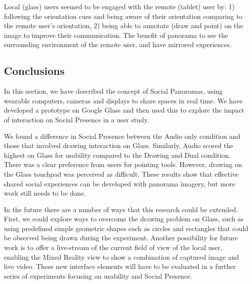 Local (glass) users seemed to be engaged with the remote (tablet) user by: 1) following the orientation cues and being aware of their orientation comparing to the remote user's orientation, 2) being able to annotate (draw and point) on the image to improve their communication. The benefit of panorama to see the surrounding environment of the remote user, and have mirrored experiences.

\subsection{Conclusions}

In this section, we have described the concept of Social Panoramas, using wearable computers, cameras and displays to share spaces in real time. We have developed a prototype on Google Glass and then used this to explore the impact of interaction on Social Presence in a user study. 

We found a difference in Social Presence between the Audio only condition and those that involved drawing interaction on Glass. Similarly, Audio scored the highest on Glass for usability compared to the Drawing and Dual condition. There was a clear preference from users for pointing tools. However, drawing on the Glass touchpad was perceived as difficult. These results show that effective shared social experiences can be developed with panorama imagery, but more work still needs to be done.

In the future there are a number of ways that this research could be extended. First, we could explore ways to overcome the drawing problem on Glass, such as using predefined simple geometric shapes such as circles and rectangles that could be observed being drawn during the experiment. Another possibility for future work is to offer a live-stream of the current field of view of the local user, enabling the Mixed Reality view to show a combination of captured image and live video. These new interface elements will have to be evaluated in a further series of experiments focusing on usability and Social Presence.

